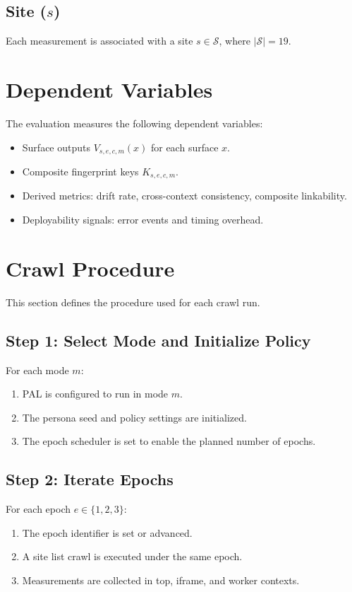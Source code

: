 \documentclass[11pt]{report}
\begin{document}
\subsection{Site ($s$)}

Each measurement is associated with a site $s \in \mathcal{S}$, where $|\mathcal{S}| = 19$.

\section{Dependent Variables}

The evaluation measures the following dependent variables:

\begin{itemize}
    \item Surface outputs $V_{s,e,c,m}(x)$ for each surface $x$.
    \item Composite fingerprint keys $K_{s,e,c,m}$.
    \item Derived metrics: drift rate, cross-context consistency, composite linkability.
    \item Deployability signals: error events and timing overhead.
\end{itemize}

\section{Crawl Procedure}

This section defines the procedure used for each crawl run.

\subsection{Step 1: Select Mode and Initialize Policy}

For each mode $m$:
\begin{enumerate}
    \item PAL is configured to run in mode $m$.
    \item The persona seed and policy settings are initialized.
    \item The epoch scheduler is set to enable the planned number of epochs.
\end{enumerate}

\subsection{Step 2: Iterate Epochs}

For each epoch $e \in \{1,2,3\}$:
\begin{enumerate}
    \item The epoch identifier is set or advanced.
    \item A site list crawl is executed under the same epoch.
    \item Measurements are collected in top, iframe, and worker contexts.
\end{enumerate}
\end{document}
